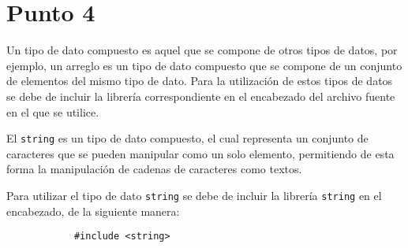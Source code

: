 \documentclass[10pt]{article}
\begin{document}
    \section*{Punto 4}
        Un tipo de dato compuesto es aquel que se compone de otros tipos de datos, por ejemplo, un arreglo es un tipo de dato compuesto que se compone de un conjunto de elementos del mismo tipo de dato. Para la utilización de estos tipos de datos se debe de incluir la librería correspondiente en el encabezado del archivo fuente en el que se utilice.

        El \texttt{string} es un tipo de dato compuesto, el cual representa un conjunto de caracteres que se pueden manipular como un solo elemento, permitiendo de esta forma la manipulación de cadenas de caracteres como textos.

        Para utilizar el tipo de dato \texttt{string} se debe de incluir la librería \texttt{string} en el encabezado, de la siguiente manera:
        \begin{lstlisting}
            #include <string>
        \end{lstlisting}
\end{document}
